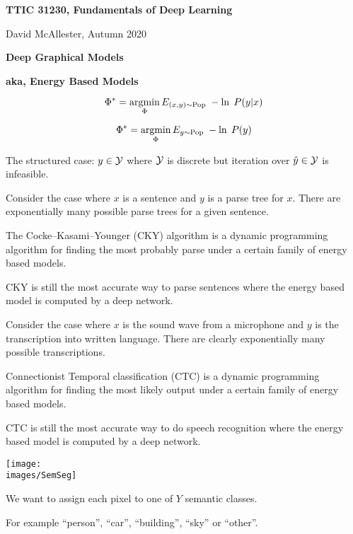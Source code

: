 




{\Huge

  \centerline{\bf TTIC 31230, Fundamentals of Deep Learning}
  \bigskip
  \centerline{David McAllester, Autumn 2020}
  \vfill
  \vfill
  \centerline{\bf Deep Graphical Models}
  \vfill
  \centerline{\bf aka, Energy Based Models}
\vfill
\vfill
\vfill


\vfill
{\color{red}
$$\Phi^* = \operatorname*{argmin}_\Phi E_{(x,y) \sim \mathrm{Pop}}\;-\ln \;P(y|x)$$

\vfill
$$\Phi^* = \operatorname*{argmin}_\Phi E_{y \sim \mathrm{Pop}}\;-\ln \;P(y)$$
}

{\color{red} The structured case:} $y \in {\cal Y}$ where ${\cal Y}$ is discrete but {\color{red} iteration over $\hat{y} \in {\cal Y}$ is infeasible}.


Consider the case where $x$ is a sentence and $y$ is a parse tree for $x$.  There are exponentially many possible parse trees for a given sentence.

\vfill
The Cocke–Kasami–Younger (CKY) algorithm is a dynamic programming algorithm for finding the most probably parse under a certain family of energy based models.

\vfill
CKY is still the most accurate way to parse sentences where the energy based model is computed by a deep network.


Consider the case where $x$ is the sound wave from a microphone and $y$ is the transcription into written language.  There are clearly exponentially many
possible transcriptions.

\vfill
Connectionist Temporal classification (CTC) is a dynamic programming algorithm for finding the most likely output under a certain family of energy based models.

\vfill
CTC is still the most accurate way to do speech recognition where the energy based model is computed by a deep network.


\centerline{\texttt{[image: \\images/SemSeg]}}

\vfill
We want to assign each pixel to one of $Y$ semantic classes.

\vfill
For example ``person'', ``car'', ``building'', ``sky'' or ``other''.

}
